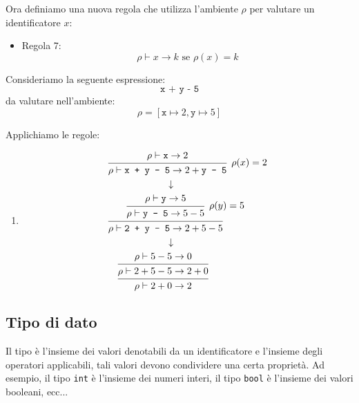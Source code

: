 \documentclass[a4paper]{article}
\begin{document}
Ora definiamo una nuova regola che utilizza l'ambiente \( \rho \) per valutare un
identificatore \( x \):
\begin{itemize}
  \item Regola 7:
    \[
      \rho \vdash x \to k \text{ se } \rho(x) = k
    \]
\end{itemize}

\vspace{1em}
\noindent
\begin{example}
  Consideriamo la seguente espressione:
  \[
    \texttt{x + y - 5}
  \] 
  da valutare nell'ambiente:
  \[
    \rho = [\texttt{x} \mapsto 2, \texttt{y} \mapsto 5]
  \] 

  \vspace{1em}
  \noindent
  Applichiamo le regole:
  \begin{enumerate}
    \item \[
        \begin{aligned}
          &\begin{prooftree}
            \hypo{\rho \vdash \texttt{x} \to 2}
            \infer1[$\rho(x) = 2$]{\rho \vdash \texttt{x + y - 5} \to 2 + \texttt{y - 5}}
          \end{prooftree}\\
          &\qquad\qquad\qquad \downarrow\\
          &\begin{prooftree}
            \hypo{\rho \vdash \texttt{y} \to 5}
            \infer1[$\rho(y)=5$]{\rho \vdash \texttt{y - 5} \to 5 - 5}
            \infer1{\rho \vdash \texttt{2 + y - 5} \to 2 + 5 - 5}
          \end{prooftree}\\
          &\qquad\qquad\qquad \downarrow\\
          &\quad \begin{prooftree}
            \hypo{\rho \vdash 5-5 \to 0}
            \infer1{\rho \vdash 2 + 5 - 5 \to 2 + 0}
            \infer1{\rho \vdash 2 + 0 \to 2}
          \end{prooftree}
        \end{aligned}
    \] 
  \end{enumerate}
\end{example}

\subsection{Tipo di dato}
Il tipo è l'insieme dei valori denotabili da un identificatore e l'insieme degli
operatori applicabili, tali valori devono
condividere una certa proprietà. Ad esempio, il tipo \texttt{int} è l'insieme dei
numeri interi, il tipo \texttt{bool} è l'insieme dei valori booleani, ecc...
\end{document}
